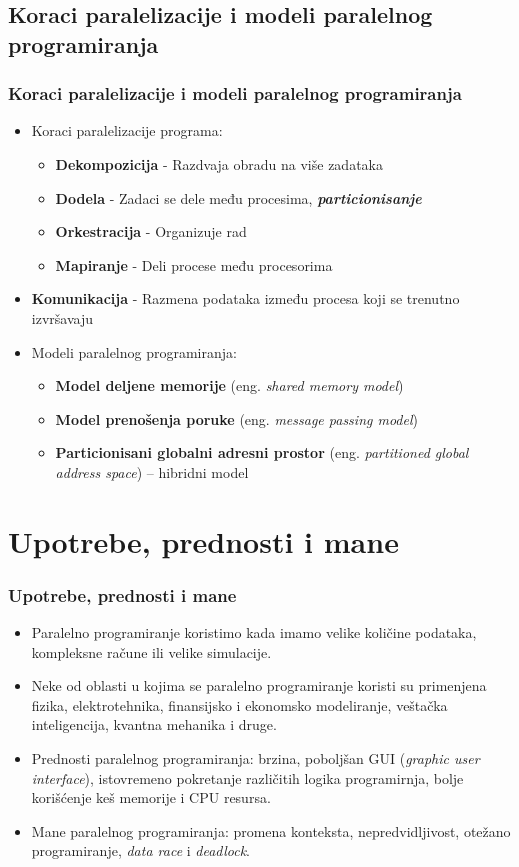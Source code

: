\documentclass{beamer}
\begin{document}
	\subsection{Koraci paralelizacije i modeli paralelnog programiranja}
	\begin{frame}[fragile]\frametitle{Koraci paralelizacije i modeli paralelnog programiranja}
	\begin{itemize}	
		\item Koraci paralelizacije programa:
		\begin{itemize}	
			\item \textbf{Dekompozicija} - Razdvaja obradu na više zadataka
			\item \textbf{Dodela} - Zadaci se dele među procesima, \textbf{\emph{particionisanje}}
			\item \textbf{Orkestracija} - Organizuje rad
			\item \textbf{Mapiranje} - Deli procese među procesorima  
		\end{itemize} 
		\bigskip
		\item \textbf{Komunikacija} - Razmena podataka između procesa koji se trenutno izvršavaju
		\bigskip
	 		\item Modeli paralelnog programiranja:
				\begin{itemize}	
					\item \textbf{Model deljene memorije} (eng. \emph{shared memory model})
					\item \textbf{Model prenošenja poruke} (eng. \emph{message passing model})
					\item \textbf{Particionisani globalni adresni prostor} (eng. \emph{partitioned global address space}) -- hibridni model
				\end{itemize}
	\end{itemize}
	\end{frame}
	
	\section{Upotrebe, prednosti i mane}
	\begin{frame}[fragile]\frametitle{Upotrebe, prednosti i mane}
		\begin{itemize}	
			\item Paralelno programiranje koristimo kada imamo velike količine podataka, kompleksne račune ili velike simulacije.
			\item Neke od oblasti u kojima se paralelno programiranje koristi su primenjena fizika, elektrotehnika, finansijsko i ekonomsko modeliranje, veštačka inteligencija, kvantna mehanika i druge.
			\bigskip
			\item Prednosti paralelnog programiranja: brzina, poboljšan GUI (\emph{graphic user interface}), istovremeno pokretanje različitih logika programirnja, bolje korišćenje keš memorije i CPU resursa.
			\item Mane paralelnog programiranja: promena konteksta, nepredvidljivost, otežano programiranje, \emph{data race} i \emph{deadlock}.
		\end{itemize}
	\end{frame}
	
\end{document}
